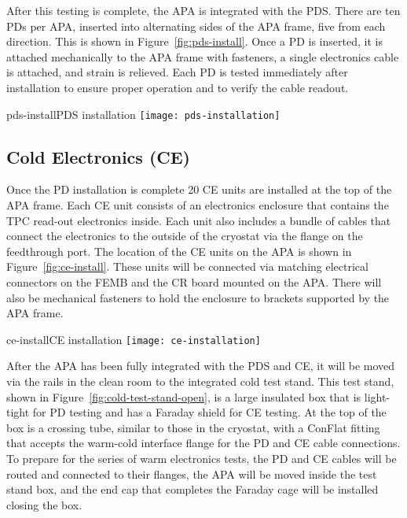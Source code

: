 After this testing is complete, the APA is integrated with the PDS.  There are ten PDs per APA, inserted into alternating sides of the APA frame, %
five from each direction.  This is shown in Figure~\ref{fig:pds-install}.  Once a PD is inserted, it is attached mechanically to the APA frame with fasteners, a single electronics cable is attached, and strain is relieved.  Each PD is tested immediately after installation to ensure proper operation and to verify the cable readout.  

\begin{cdrfigure}{pds-install}{PDS installation}
\texttt{[image: pds-installation]}
\end{cdrfigure}

\subsection{Cold Electronics (CE)}
\label{subsec:ce_install}

Once the PD installation is complete 20 CE units are installed at the top of the APA frame.  Each CE unit consists of an electronics enclosure that contains the TPC read-out electronics inside.  Each unit also includes a bundle of cables that connect the electronics to the outside of the cryostat via the flange on the feedthrough port.  %
The location of the CE units on the APA is shown in Figure~\ref{fig:ce-install}.  These units will be connected via matching electrical connectors on the FEMB and the CR board mounted on the APA.  There will also be mechanical fasteners to hold the enclosure to brackets supported by the APA frame.  %

\begin{cdrfigure}[CE installation]{ce-install}{CE installation}
\texttt{[image: ce-installation]}
\end{cdrfigure}

After the APA has been fully integrated with the PDS and CE, it will be moved via the rails in the clean room to the integrated cold test stand.  This test stand, shown in Figure~\ref{fig:cold-test-stand-open}, is a large insulated box that is light-tight for PD testing and has a Faraday shield for CE testing.  At the top of the box is a crossing tube, similar to those in the cryostat, with a ConFlat fitting that accepts the warm-cold interface flange for the PD and CE cable connections.  To prepare for the series of warm electronics tests, the PD and CE cables will be routed and connected to their flanges, the APA will be moved inside the test stand box, and the end cap that completes the Faraday cage will be installed closing the box.  %

